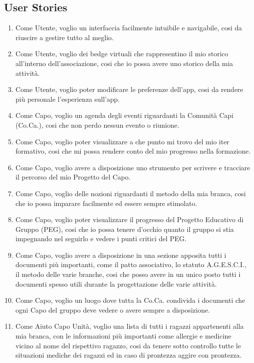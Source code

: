 \documentclass[11pt]{article}
\begin{document}
\subsection{User Stories}
\begin{enumerate}
  \item Come Utente, voglio un interfaccia facilmente intuibile e navigabile, cosi da riuscire a gestire tutto al meglio.
  \item Come Utente, voglio dei bedge virtuali che rappresentino il mio storico all'interno dell'associazione, cosi che io possa avere uno storico della mia attività.
  \item Come Utente, voglio poter modificare le preferenze dell'app, cosi da rendere più personale l'esperienza sull'app.
  \item Come Capo, voglio un agenda degli eventi riguardanti la Comunità Capi (Co.Ca.), cosi che non perdo nessun evento o riunione.
  \item Come Capo, voglio poter visualizzare a che punto mi trovo del mio iter formativo, cosi che mi possa rendere conto del mio progresso nella formazione.
  \item Come Capo, voglio avere a disposizione uno strumento per scrivere e tracciare il percorso del mio Progetto del Capo.
  \item Come Capo, voglio delle nozioni riguardanti il metodo della mia branca, cosi che io possa imparare facilmente ed essere sempre stimolato.
  \item Come Capo, voglio poter visualizzare il progresso del Progetto Educativo di Gruppo (PEG), cosi che io possa tenere d'occhio quanto il gruppo si stia impegnando nel seguirlo e vedere i punti critici del PEG.
  \item Come Capo, voglio avere a disposizione in una sezione apposita tutti i documenti più importanti, come il patto associativo, lo statuto A.G.E.S.C.I., il metodo delle varie branche, cosi che posso avere in un unico posto tutti i documenti spesso utili durante la progettazione delle varie attività.
  \item Come Capo, voglio un luogo dove tutta la Co.Ca. condivida i documenti che ogni Capo del gruppo deve vedere o avere sempre a disposizione.
\vspace*{1cm}
  \item Come Aiuto Capo Unità, voglio una lista di tutti i ragazzi appartenenti alla mia branca, con le informazioni più importanti come allergie e medicine vicino al nome del rispettivo ragazzo, cosi da tenere sotto controllo tutte le situazioni mediche dei ragazzi ed in caso di prontezza aggire con prontezza.

\end{enumerate}
\end{document}
